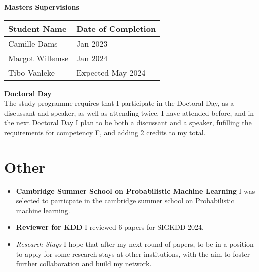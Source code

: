 \textbf{Masters Supervisions}
    \begin{table}[h]
    \begin{tabular}{|l|l|}
        \hline
        \textbf{Student Name} & \textbf{Date of Completion} \\ \hline
        Camille Dams & Jan 2023 \\ \hline
        Margot Willemse & Jan 2024 \\ \hline
        Tibo Vanleke & Expected May 2024\\ \hline
    \end{tabular}
\end{table}

\textbf{Doctoral Day} \\
The study programme requires that I participate in the Doctoral Day, as a discussant and speaker, as well as
attending twice. I have attended before, and in the next Doctoral Day I plan to be both a discussant and a speaker,
fufilling the requirements for competency F, and adding 2 credits to my total.

\section{Other}

\begin{itemize}
    \item \textbf{Cambridge Summer School on Probabilistic Machine Learning} I was selected to particpate in the
    cambridge summer school on Probabilistic machine learning.
    \item \textbf{Reviewer for KDD} I reviewed 6 papers for SIGKDD 2024.
    \item \textit{Research Stays} I hope that after my next round of papers, to be in a position to apply for some
    research stays at other institutions, with the aim to foster further collaboration and build my network.
\end{itemize}

